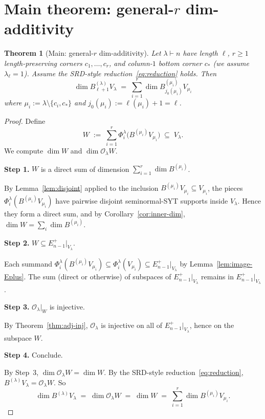 \documentclass[11pt]{article}
\newtheorem{theorem}{Theorem}
\theoremstyle{definition}
\begin{document}
\section{Main theorem: general-$r$ dim-additivity}\label{sec:main}

\begin{theorem}[Main: general-$r$ dim-additivity]
\label{thm:r-additivity}
Let $\lambda \vdash n$ have length $\ell$, $r \ge 1$
length-preserving corners $c_1, \ldots, c_r$, and column-$1$ bottom
corner $c_*$ (we assume $\lambda_\ell = 1$). Assume the SRD-style
reduction~\eqref{eq:reduction} holds. Then
\begin{equation}\label{eq:r-additivity}
   \dim B_{\ell+1}^{(\lambda)} V_\lambda
   \;=\;
   \sum_{i=1}^r \dim B^{(\mu_i)}_{j_0(\mu_i)} V_{\mu_i}
\end{equation}
where $\mu_i := \lambda \setminus \{c_i, c_*\}$ and
$j_0(\mu_i) := \ell(\mu_i) + 1 = \ell$.
\end{theorem}

\begin{proof}
Define
\[
   W \;:=\; \sum_{i=1}^r \Phi_i^\lambda\big(B^{(\mu_i)} V_{\mu_i}\big)
   \;\subseteq\; V_\lambda.
\]
We compute $\dim W$ and $\dim \mathcal{O}_\lambda W$.

\textbf{Step 1.} $W$ is a direct sum of dimension
$\sum_{i=1}^r \dim B^{(\mu_i)}$.

By Lemma~\ref{lem:disjoint} applied to the inclusion
$B^{(\mu_i)} V_{\mu_i} \subseteq V_{\mu_i}$, the pieces
$\Phi_i^\lambda(B^{(\mu_i)} V_{\mu_i})$ have pairwise disjoint
seminormal-SYT supports inside $V_\lambda$. Hence they form a direct
sum, and by Corollary~\ref{cor:inner-dim},
$\dim W = \sum_i \dim B^{(\mu_i)}$.

\textbf{Step 2.} $W \subseteq E_{n-1}^+|_{V_\lambda}$.

Each summand $\Phi_i^\lambda(B^{(\mu_i)} V_{\mu_i}) \subseteq
\Phi_i^\lambda(V_{\mu_i}) \subseteq E_{n-1}^+|_{V_\lambda}$ by
Lemma~\ref{lem:image-Eplus}. The sum (direct or otherwise) of
subspaces of $E_{n-1}^+|_{V_\lambda}$ remains in
$E_{n-1}^+|_{V_\lambda}$.

\textbf{Step 3.} $\mathcal{O}_\lambda|_W$ is injective.

By Theorem~\ref{thm:adj-inj}, $\mathcal{O}_\lambda$ is injective
on all of $E_{n-1}^+|_{V_\lambda}$, hence on the subspace $W$.

\textbf{Step 4.} Conclude.

By Step~3, $\dim \mathcal{O}_\lambda W = \dim W$. By the SRD-style
reduction~\eqref{eq:reduction}, $B^{(\lambda)} V_\lambda =
\mathcal{O}_\lambda W$. So
\[
   \dim B^{(\lambda)} V_\lambda \;=\; \dim \mathcal{O}_\lambda W
   \;=\; \dim W \;=\; \sum_{i=1}^r \dim B^{(\mu_i)} V_{\mu_i}.
\]
\end{proof}
\end{document}

